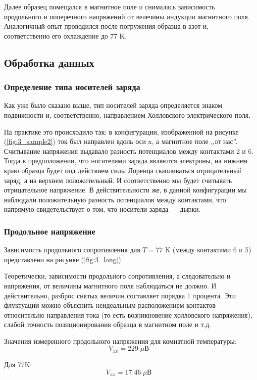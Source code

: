\documentclass[a4paper, 12pt]{article}
\begin{document}
Далее образец помещался в магнитное поле и снималась зависимость продольного и поперечного напряжений от велечины индукции магнитного поля. Аналогичный опыт проводился после погружения образца в азот и, соответственно его охлаждение до 77 K.

\subsection{Обработка данных}
\subsubsection{Определение типа носителей заряда}
Как уже было сказано выше, тип носителей заряда определяется знаком подвижности и, соответственно, направлением Холловского электрического поля. 

На практике это происходило так: в конфигурации, изображенной на рисунке (\ref{fig:3_sample2}) ток был направлен вдоль оси x, а магнитное поле ,,от нас''. Считывание напряжения выдавало разность потенциалов между контактами 2 и 6. Тогда в предположении, что носителями заряда являются электроны, на нижнем краю образца будет под действием силы Лоренца скапливаться отрицательный заряд, а на верхнем положительный. И соответственно мы будет считывать отрицательное напряжение. В действительности же, в данной конфигурации мы наблюдали положительную разность потенциалов между контактами, что напрямую свидетельствует о том, что носители заряда --- дырки.
\subsubsection{Продольное напряжение}

Зависимость продольного сопротивления для $T=77$ K (между контактами 6 и 5) представлено на рисунке (\ref{fig:3_long})

Теоретически, зависимости продольного сопротивления, а следовательно и напряжения, от величины магнитного поля наблюдаться не должно. И действительно, разброс снятых величин составляет порядка 1 процента. Эти флуктуации можно объяснить неидеальным расположением контактов относительно направления тока (то есть возникновение холловского напряжения), слабой точность позиционирования образца в магнитном поле и т.д. 

Значения измеренного продольного напряжения для комнатной температуры:
$$V_{xx} = 229 \; \mu \text{В}  $$

Для 77K:
$$V_{xx} = 17.46 \; \mu \text{В} $$
\end{document}
